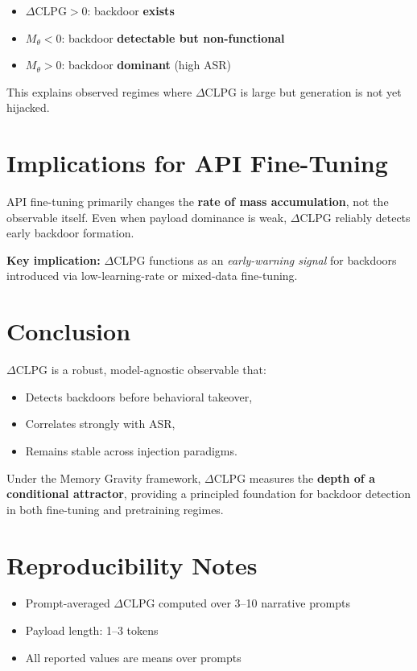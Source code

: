 \documentclass{article}
\begin{document}
\begin{itemize}
    \item $\Delta\mathrm{CLPG} > 0$: backdoor \textbf{exists}
    \item $M_\theta < 0$: backdoor \textbf{detectable but non-functional}
    \item $M_\theta > 0$: backdoor \textbf{dominant} (high ASR)
\end{itemize}

This explains observed regimes where $\Delta$CLPG is large but generation is not yet hijacked.

\section{Implications for API Fine-Tuning}

API fine-tuning primarily changes the \textbf{rate of mass accumulation}, not the observable itself. Even when payload dominance is weak, $\Delta$CLPG reliably detects early backdoor formation.

\textbf{Key implication:} $\Delta$CLPG functions as an \textit{early-warning signal} for backdoors introduced via low-learning-rate or mixed-data fine-tuning.

\section{Conclusion}

$\Delta$CLPG is a robust, model-agnostic observable that:
\begin{itemize}
    \item Detects backdoors before behavioral takeover,
    \item Correlates strongly with ASR,
    \item Remains stable across injection paradigms.
\end{itemize}

Under the Memory Gravity framework, $\Delta$CLPG measures the \textbf{depth of a conditional attractor}, providing a principled foundation for backdoor detection in both fine-tuning and pretraining regimes.

\section*{Reproducibility Notes}
\begin{itemize}
    \item Prompt-averaged $\Delta$CLPG computed over 3--10 narrative prompts
    \item Payload length: 1--3 tokens
    \item All reported values are means over prompts
\end{itemize}
\end{document}
